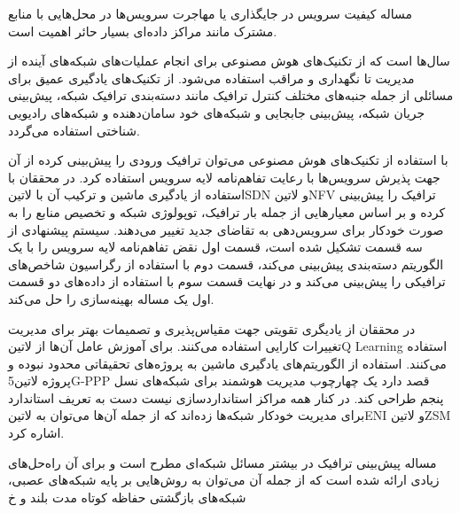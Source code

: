 مساله کیفیت سرویس در جایگذاری یا مهاجرت سرویس‌ها در محل‌هایی با منابع مشترک مانند مراکز داده‌ای بسیار حائر اهمیت است.


سال‌ها است که از تکنیک‌های هوش مصنوعی برای انجام عملیات‌های شبکه‌های آینده از مدیریت تا نگهداری و مراقب استفاده می‌شود. از تکنیک‌های یادگیری عمیق
برای مسائلی از جمله جنبه‌های مختلف کنترل ترافیک مانند دسته‌بندی ترافیک شبکه، پیش‌بینی جریان شبکه، پیش‌بینی جابجایی
و شبکه‌های خود سامان‌دهنده و شبکه‌های رادیویی شناختی
استفاده می‌گردد. 

با استفاده از تکنیک‌های هوش مصنوعی می‌توان ترافیک ورودی را پیش‌بینی کرده از آن جهت پذیرش سرویس‌ها با رعایت تفاهم‌نامه لایه سرویس استفاده کرد. 
در  محققان با استفاده از یادگیری ماشین و ترکیب آن با ‌لاتین{SDN} و ‌لاتین{NFV} ترافیک را پیش‌بینی کرده و بر اساس معیارهایی از جمله بار ترافیک،
توپولوژی شبکه و تخصیص منابع را به صورت خودکار برای سرویس‌دهی به تقاضای جدید تغییر می‌دهند. سیستم پیشنهادی  از سه قسمت تشکیل شده است، قسمت اول
نقض تفاهم‌نامه لایه سرویس را با یک الگوریتم دسته‌بندی پیش‌بینی می‌کند، قسمت دوم با استفاده از رگراسیون شاخص‌های ترافیکی را پیش‌بینی می‌کند و در نهایت قسمت سوم با استفاده از
داده‌های دو قسمت اول یک مساله بهینه‌سازی را حل می‌کند.

در  محققان از یادیگری تقویتی جهت مقیاس‌پذیری و تصمیمات بهتر برای مدیریت تغییرات کارایی استفاده می‌کنند. برای آموزش عامل آن‌ها از ‌لاتین{Q Learning}
استفاده می‌کنند. استفاده از الگوریتم‌های یادگیری ماشین به پروژه‌های تحقیقاتی محدود نبوده و پروژه ‌لاتین{5G-PPP} قصد دارد یک چهارچوب مدیریت هوشمند برای شبکه‌های نسل پنجم
طراحی کند. در کنار همه مراکز استانداردسازی نیست دست به تعریف استاندارد برای مدیریت خودکار شبکه‌ها زده‌اند که از جمله آن‌ها می‌توان به ‌لاتین{ENI} و ‌لاتین{ZSM} اشاره کرد.

مساله پیش‌بینی ترافیک در بیشتر مسائل شبکه‌ای مطرح است و برای آن راه‌حل‌های زیادی ارائه شده است که از جمله آن می‌توان به روش‌هایی بر پایه شبکه‌های عصبی،
شبکه‌های بازگشتی حفاظه کوتاه مدت بلند و ‌خ
